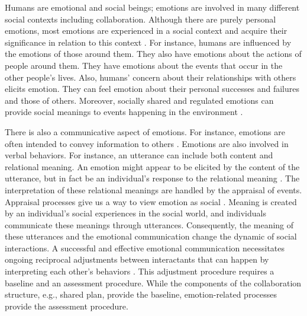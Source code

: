Humans are emotional and social beings; emotions are involved in many different
social contexts including collaboration. Although there are purely personal
emotions, most emotions are experienced in a social context and acquire their
significance in relation to this context
\cite{parkinson:emotion-social-interaction}. For instance, humans are influenced
by the emotions of those around them. They also have emotions about the actions
of people around them. They have emotions about the events that occur in the
other people's lives. Also, humans' concern about their relationships with
others elicits emotion. They can feel emotion about their personal successes and
failures and those of others. Moreover, socially shared and regulated emotions
can provide social meanings to events happening in the environment
\cite{wisecup:sociology-emotions}.

There is also a communicative aspect of emotions. For instance, emotions are
often intended to convey information to others \cite{goffman:self-presentation}.
Emotions are also involved in verbal behaviors. For instance, an utterance can
include both content and relational meaning. An emotion might appear to be
elicited by the content of the utterance, but in fact be an individual's
response to the relational meaning \cite{planalp:communicating-emotion}. The
interpretation of these relational meanings are handled by the appraisal of
events. Appraisal processes give us a way to view emotion as social
\cite{hooft:sharing-emotions}. Meaning is created by an individual's social
experiences in the social world, and individuals communicate these meanings
through utterances. Consequently, the meaning of these utterances and the
emotional communication change the dynamic of social interactions. A successful
and effective emotional communication necessitates ongoing reciprocal
adjustments between interactants that can happen by interpreting each other's
behaviors \cite{parkinson:emotion-social-interaction}. This adjustment procedure
requires a baseline and an assessment procedure. While the components of the
collaboration structure, e.g., shared plan, provide the baseline,
emotion-related processes provide the assessment procedure.

